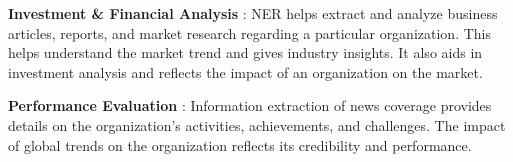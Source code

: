 \begin{itemize}
\textbf{Investment \& Financial Analysis} : NER helps extract and analyze business articles, reports, and market research regarding a particular organization. This helps understand the market trend and gives industry insights. It also aids in investment analysis and reflects the impact of an organization on the market.

\textbf{Performance Evaluation} : Information extraction of news coverage provides details on the organization’s activities, achievements, and challenges. The impact of global trends on the organization reflects its credibility and performance.
\end{itemize}






\vspace{10pt}




